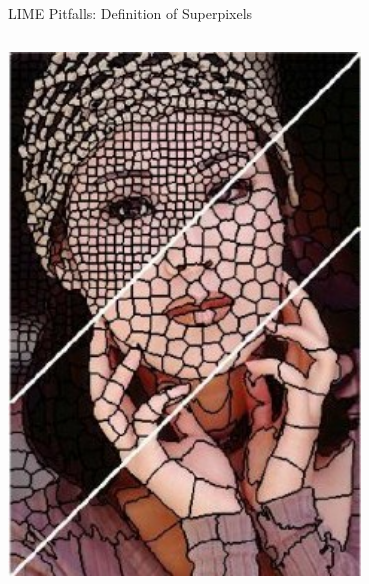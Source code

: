 \documentclass[11pt,compress,t,notes=noshow, aspectratio=169, xcolor=table]{beamer}
\begin{document}
\begin{vbframe}{LIME Pitfalls: Definition of Superpixels}
\begin{columns}
\begin{column}{0.4\textwidth}
        \centering
        \includegraphics[width=0.7\textwidth]{figure/superpixel_woman}
        
    \end{column}
    
\end{columns}

\end{vbframe}


\endlecture
\end{document}
